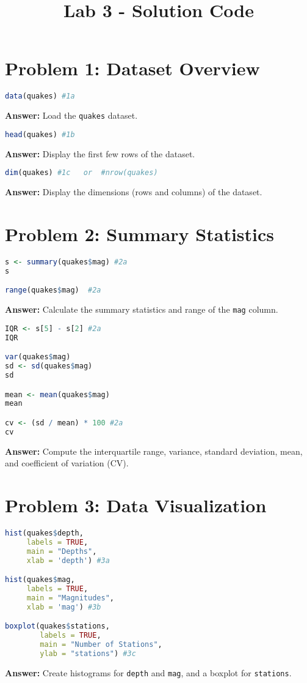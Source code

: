 \documentclass[12pt]{article}
\title{Lab 3 - Solution Code}
\author{}
\date{}
\begin{document}
\maketitle

\section*{Problem 1: Dataset Overview}
\begin{lstlisting}[language=R]
data(quakes) #1a
\end{lstlisting}
\textbf{Answer:} Load the \texttt{quakes} dataset.

\begin{lstlisting}[language=R]
head(quakes) #1b
\end{lstlisting}
\textbf{Answer:} Display the first few rows of the dataset.

\begin{lstlisting}[language=R]
dim(quakes) #1c   or  #nrow(quakes)
\end{lstlisting}
\textbf{Answer:} Display the dimensions (rows and columns) of the dataset.

\section*{Problem 2: Summary Statistics}
\begin{lstlisting}[language=R]
s <- summary(quakes$mag) #2a
s

range(quakes$mag)  #2a
\end{lstlisting}
\textbf{Answer:} Calculate the summary statistics and range of the \texttt{mag} column.

\begin{lstlisting}[language=R]
IQR <- s[5] - s[2] #2a
IQR

var(quakes$mag)
sd <- sd(quakes$mag)
sd

mean <- mean(quakes$mag)
mean

cv <- (sd / mean) * 100 #2a
cv
\end{lstlisting}
\textbf{Answer:} Compute the interquartile range, variance, standard deviation, mean, and coefficient of variation (CV).

\section*{Problem 3: Data Visualization}
\begin{lstlisting}[language=R]
hist(quakes$depth, 
     labels = TRUE, 
     main = "Depths", 
     xlab = 'depth') #3a

hist(quakes$mag, 
     labels = TRUE, 
     main = "Magnitudes", 
     xlab = 'mag') #3b

boxplot(quakes$stations, 
        labels = TRUE, 
        main = "Number of Stations", 
        ylab = "stations") #3c
\end{lstlisting}
\textbf{Answer:} Create histograms for \texttt{depth} and \texttt{mag}, and a boxplot for \texttt{stations}.
\end{document}
